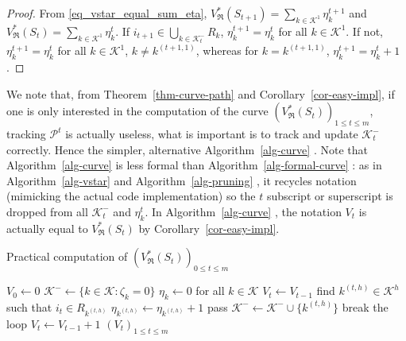 \documentclass[
  11pt,
  a4paper,
]{article}
\theoremstyle{plain}
\theoremstyle{definition}
\theoremstyle{plain}
\theoremstyle{definition}
\theoremstyle{plain}
\theoremstyle{remark}
\begin{document}
\begin{proof}
From \eqref{eq_vstar_equal_sum_eta},
\(V^*_{\mathfrak{R}}(S_{t+1})=\sum_{k\in\mathcal{K}^1} \eta_k^{t+1}\)
and \(V^*_{\mathfrak{R}}(S_{t})=\sum_{k\in\mathcal{K}^1} \eta_k^{t}\).
If \(i_{t+1}\in \bigcup_{k\in\mathcal{K}^-_t}R_k\),
\(\eta_k^{t+1}=\eta_k^{t}\) for all \(k\in\mathcal{K}^1\). If not,
\(\eta_k^{t+1}=\eta_k^{t}\) for all \(k\in\mathcal{K}^1\),
\(k\neq k^{(t+1,1)}\), whereas for \(k= k^{(t+1,1)}\),
\(\eta_k^{t+1}=\eta_k^{t}+1\).
\end{proof}

We note that, from Theorem~\ref{thm-curve-path} and
Corollary~\ref{cor-easy-impl}, if one is only interested in the
computation of the curve
\(\left(V^*_{\mathfrak{R}}(S_{t})\right)_{1\leq t\leq m}\), tracking
\(\mathcal{P}^t\) is actually useless, what is important is to track and
update \(\mathcal{K}^-_t\) correctly. Hence the simpler, alternative
 Algorithm~\ref{alg-curve} . Note that  Algorithm~\ref{alg-curve}  is
less formal than  Algorithm~\ref{alg-formal-curve} : as in
 Algorithm~\ref{alg-vstar}  and  Algorithm~\ref{alg-pruning} , it
recycles notation (mimicking the actual code implementation) so the
\(t\) subscript or superscript is dropped from all \(\mathcal{K}^-_t\)
and \(\eta_k^t\). In  Algorithm~\ref{alg-curve} , the notation \(V_t\)
is actually equal to \(V^*_{\mathfrak{R}}(S_{t})\) by
Corollary~\ref{cor-easy-impl}.

\begin{algorithm}[htb!]
\caption{Practical computation of $(V^*_{\mathfrak{R}}(S_t))_{0\leq t\leq m}$}
\label{alg-curve}
\begin{algorithmic}[1]
  \State $V_0\gets 0$
  \State $\mathcal{K}^-\gets\{k\in\mathcal{K} : \zeta_k=0  \}$
  \State $\eta_k\gets 0$ for all $k\in\mathcal{K}$
      \State $V_{t}\gets V_{t-1}$
    \Else
        \State find $k^{(t,h)}\in\mathcal{K}^{h}$ such that $i_t\in R_{k^{(t,h)}}$
        \State $\eta_{k^{(t,h)}}\gets\eta_{k^{(t,h)}} + 1$
          \State pass
        \Else
          \State $\mathcal{K}^- \gets \mathcal{K}^-\cup \{ k^{(t,h)} \}$
          \State break the loop
        \EndIf
      \EndFor
     \State $V_{t}\gets V_{t-1} + 1$
    \EndIf
  \EndFor
  \State\Return $(V_t)_{1\leq t \leq m}$
\EndProcedure
\end{algorithmic}
\end{algorithm}
\end{document}
